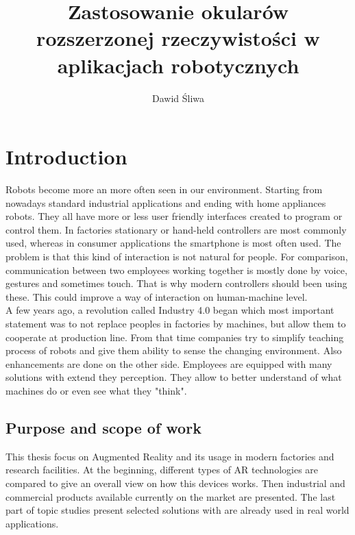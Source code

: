 \documentclass[printmode,en]{mgr}
\title{Zastosowanie okularów rozszerzonej rzeczywistości w aplikacjach
robotycznych}
\author{Dawid Śliwa}
\begin{document}

\maketitle %


\tableofcontents %

\chapter{Introduction}
Robots become more an more often seen in our environment. Starting from nowadays standard industrial applications and ending with home appliances robots. They all have more or less user friendly interfaces created to program or control them. In factories stationary or hand-held controllers are most commonly used, whereas in consumer applications the smartphone is most often used. The problem is that this kind of interaction is not natural for people. For comparison, communication between two employees working together is mostly done by voice, gestures and sometimes touch. That is why modern controllers should been using these. This could improve a way of interaction on human-machine level.\\

A few years ago, a revolution called Industry 4.0 began which most important statement was to not replace peoples in factories by machines, but allow them to cooperate at production line. From that time companies try to simplify teaching process of robots and give them ability to sense the changing environment. Also enhancements are done on the other side. Employees are equipped with many solutions with extend they perception. They allow to better understand of what machines do or even see what they "think".

\section{Purpose and scope of work}
This thesis focus on Augmented Reality and its usage in modern factories and research facilities. At the beginning, different types of AR technologies are compared to give an overall view on how this devices works. Then industrial and commercial products available currently on the market are presented. The last part of topic studies present selected solutions with are already used in real world applications.\\
\end{document}
